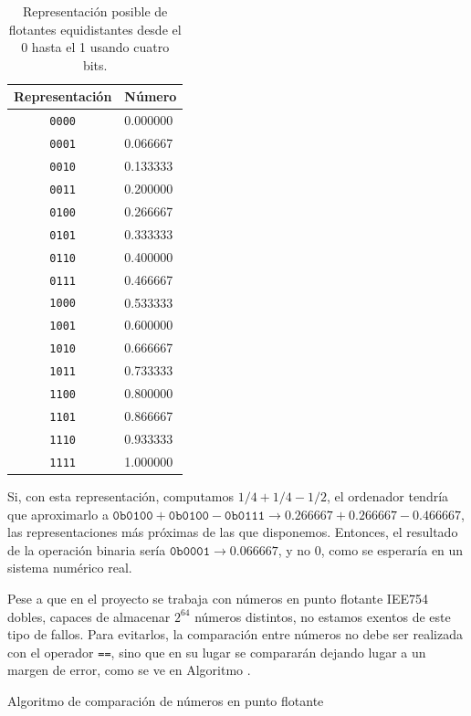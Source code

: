 \begin{table}
\begin{tabular}{cl}
 Representación & Número \\\hline
  \texttt{0000} & 0.000000 \\
  \texttt{0001} & 0.066667 \\
  \texttt{0010} & 0.133333 \\
  \texttt{0011} & 0.200000 \\
  \texttt{0100} & 0.266667 \\
  \texttt{0101} & 0.333333 \\
  \texttt{0110} & 0.400000 \\
  \texttt{0111} & 0.466667 \\
  \texttt{1000} & 0.533333 \\
  \texttt{1001} & 0.600000 \\
  \texttt{1010} & 0.666667 \\
  \texttt{1011} & 0.733333 \\
  \texttt{1100} & 0.800000 \\
  \texttt{1101} & 0.866667 \\
  \texttt{1110} & 0.933333 \\
  \texttt{1111} & 1.000000
 \end{tabular}
 \caption{Representación posible de flotantes equidistantes desde el 0 hasta el 1 usando cuatro bits.}
\end{table}

Si, con esta representación, computamos $1/4+1/4-1/2$, el ordenador tendría que aproximarlo a 
$\mathtt{0b0100}+\mathtt{0b0100}-\mathtt{0b0111} \rightarrow 0.266667+0.266667-0.466667$, las representaciones más 
próximas de las que disponemos. Entonces, el resultado de la operación binaria sería $\mathtt{0b0001} \rightarrow 
0.066667$, y no $0$, como se esperaría en un sistema numérico real.

Pese a que en el proyecto se trabaja con números en punto flotante IEE754 dobles, capaces de almacenar $2^64$ números 
distintos, no estamos exentos de este tipo de fallos. Para evitarlos, la comparación entre números no debe ser 
realizada con el operador \texttt{==}, sino que en su lugar se compararán dejando lugar a un margen de error, como se 
ve en Algoritmo .

\begin{algorithm}
 \caption{Algoritmo de comparación de números en punto flotante}
\end{algorithm}

